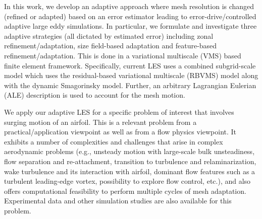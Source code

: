 In this work, we develop an adaptive approach where mesh resolution is changed (refined or adapted) based on an error estimator leading to error-drive/controlled adaptive large eddy simulations.
In particular, we formulate and investigate three adaptive strategies
(all dictated by estimated error) including zonal refinement/adaptation, size field-based adaptation and
feature-based refinement/adaptation. 
This is done in a variational multiscale (VMS) based finite element
framework. 
Specifically, current LES uses a combined subgrid-scale model which uses the residual-based
variational multiscale (RBVMS) model along with the dynamic Smagorinsky model.
Further, an arbitrary Lagrangian Eulerian (ALE) description is used to account for the mesh motion.

We apply our adaptive LES for a specific problem of interest that involves surging motion of an airfoil. 
This is a relevant problem from a practical/application viewpoint as well as from a flow physics viewpoint.
It exhibits a number of complexities and challenges that arise in complex aerodynamic
problems (e.g., unsteady motion with large-scale bulk unsteadiness, flow separation and re-attachment, transition to turbulence and relaminarization, wake turbulence and its interaction with airfoil, dominant flow features such as a turbulent leading-edge vortex, possibility to explore flow control, etc.), and also
offers computational feasibility to perform multiple cycles of mesh adaptation. Experimental data and other simulation studies are also available for this problem.